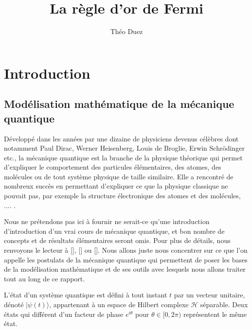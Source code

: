 \documentclass[12pt,openany,a4paper, titlepage]{article}
\title{La règle d'or de Fermi}
\author{Théo Duez }
\newcommand{\HH}{\mathcal{H}}
\theoremstyle{definition}
\theoremstyle{definition}
\theoremstyle{definition}
\theoremstyle{definition}
\theoremstyle{definition}
\theoremstyle{definition}
\begin{document}
\maketitle

\newpage

\tableofcontents

\newpage

\section{Introduction}

\subsection{Modélisation mathématique de la mécanique quantique}

Développé dans les années par une dizaine de physiciens devenus célèbres dont notamment Paul Dirac, Werner Heisenberg, Louis de Broglie, Erwin Schrödinger etc.,  la mécanique quantique est la branche de la physique théorique qui permet d'expliquer le comportement des particules élémentaires, des atomes, des molécules ou de tout système physique de taille similaire. Elle a rencontré de nombreux succès en permettant d'expliquer ce que la physique classique ne pouvait pas, par exemple la structure électronique des atomes et des molécules, .... . 

Nous ne prétendons pas ici à fournir ne serait-ce qu'une introduction d'introduction d'un vrai cours de mécanique quantique, et bon nombre de concepts et de résultats élémentaires seront omis. Pour plus de détails, nous renvoyons le lecteur à [], [] ou []. Nous allons juste nous concentrer sur ce que l'on appelle les postulats de la mécanique quantique qui permettent de poser les bases de la modélisation mathématique et de ses outils avec lesquels nous allons traiter tout au long de ce rapport.

\vspace{3mm}
\begin{tcolorbox}[colback=gray!5!white,
                  colframe=gray!80!white,
                  title= Postulat 1 : Principe de superposition ]
L'état d'un système quantique est défini à tout instant $t$ par un vecteur unitaire, dénoté $|\psi(t)\rangle$, appartenant à un espace de Hilbert complexe $\HH$ séparable. Deux états qui différent d'un facteur de phase $e^{i\theta}$ pour $\theta\in[0,2\pi)$ représentent le même état.
\end{tcolorbox}
\vspace{3mm}
\end{document}
